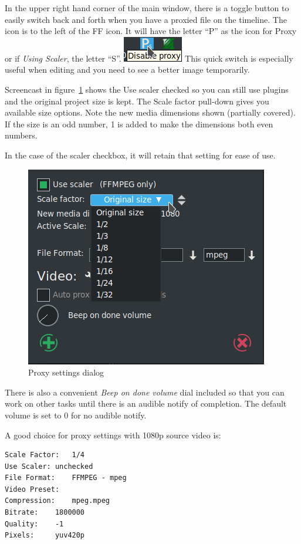 In the upper right hand corner of the main window, there is a toggle button to easily switch back and forth when you have a proxied file on the timeline.  The icon is to the left of the FF icon.  It will have the letter “P” as the icon for Proxy or if \textit{Using Scaler}, the letter “S”. \quad \includegraphics[height=\baselineskip]{images/proxy-01.png} \quad This quick switch is especially useful when editing and you need to see a better image temporarily.

Screencast in figure~\ref{fig:proxy-02} shows the Use scaler checked so you can still use plugins and the original project size is kept.  The Scale factor pull-down gives you available size options.  Note the new media dimensions shown (partially covered).  If the size is an odd number, 1 is added to make the dimensions both even numbers.

In the case of the scaler checkbox, it will retain that setting for ease of use.

\begin{figure}[htpb]
	\centering
	\includegraphics[width=0.6\linewidth]{images/proxy-02.png}
	\caption{Proxy settings dialog}
	\label{fig:proxy-02}
\end{figure}

There is also a convenient \textit{Beep on done volume} dial included so that you can work on other tasks until there is an audible notify of completion.  The default volume is set to 0 for no audible notify.

A good choice for proxy settings with 1080p source video is:

\begin{lstlisting}[numbers=none]
Scale Factor: 	1/4
Use Scaler:	unchecked
File Format:	FFMPEG - mpeg
Video Preset:
Compression:	mpeg.mpeg
Bitrate:	1800000
Quality:	-1
Pixels:		yuv420p
\end{lstlisting}

